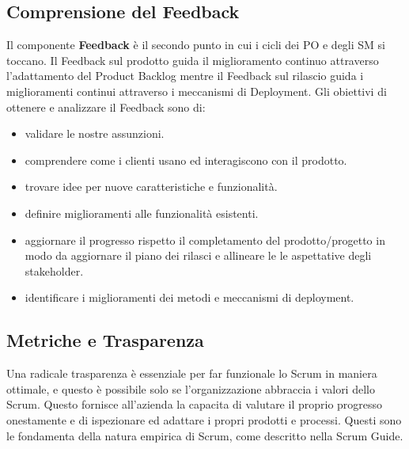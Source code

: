 \documentclass[italian,12pt,a4paper,parskip=full]{scrartcl}
\begin{document}
\subsection{Comprensione del Feedback}
Il componente \textbf{Feedback} è il secondo punto in cui i cicli dei PO e degli SM 
si toccano. Il Feedback sul prodotto guida il miglioramento continuo attraverso l'adattamento del Product Backlog mentre il Feedback sul rilascio guida i miglioramenti continui attraverso i meccanismi di Deployment. Gli obiettivi di ottenere e analizzare il Feedback sono di:
\begin{itemize}
\item validare le nostre assunzioni.
\item comprendere come i clienti usano ed interagiscono con il prodotto.
\item trovare idee per nuove caratteristiche e funzionalità.
\item definire miglioramenti alle funzionalità esistenti.
\item aggiornare il progresso rispetto il completamento del prodotto/progetto in modo
da aggiornare il piano dei rilasci e allineare le le aspettative degli stakeholder.
\item identificare i miglioramenti dei metodi e meccanismi di deployment.
\end{itemize}

\subsection{Metriche e Trasparenza}
Una radicale trasparenza è essenziale per far funzionale lo Scrum in maniera ottimale,
e questo è possibile solo se l'organizzazione abbraccia i valori dello Scrum.
Questo fornisce all'azienda la capacita di valutare il proprio progresso onestamente
e di ispezionare ed adattare i propri prodotti e processi. Questi sono le fondamenta
della natura empirica di Scrum, come descritto nella Scrum Guide.
\end{document}

